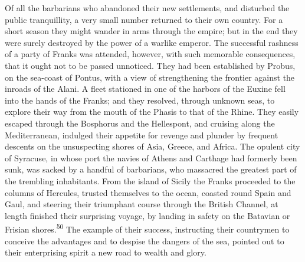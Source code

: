 



Of all the barbarians who abandoned their new settlements, and
disturbed the public tranquillity, a very small number returned
to their own country. For a short season they might wander in
arms through the empire; but in the end they were surely
destroyed by the power of a warlike emperor. The successful
rashness of a party of Franks was attended, however, with such
memorable consequences, that it ought not to be passed unnoticed.
They had been established by Probus, on the sea-coast of Pontus,
with a view of strengthening the frontier against the inroads of
the Alani. A fleet stationed in one of the harbors of the Euxine
fell into the hands of the Franks; and they resolved, through
unknown seas, to explore their way from the mouth of the Phasis
to that of the Rhine. They easily escaped through the Bosphorus
and the Hellespont, and cruising along the Mediterranean,
indulged their appetite for revenge and plunder by frequent
descents on the unsuspecting shores of Asia, Greece, and Africa.
The opulent city of Syracuse, in whose port the navies of Athens
and Carthage had formerly been sunk, was sacked by a handful of
barbarians, who massacred the greatest part of the trembling
inhabitants. From the island of Sicily the Franks proceeded to
the columns of Hercules, trusted themselves to the ocean, coasted
round Spain and Gaul, and steering their triumphant course
through the British Channel, at length finished their surprising
voyage, by landing in safety on the Batavian or Frisian shores.\textsuperscript{50}
The example of their success, instructing their countrymen to
conceive the advantages and to despise the dangers of the sea,
pointed out to their enterprising spirit a new road to wealth and
glory.


